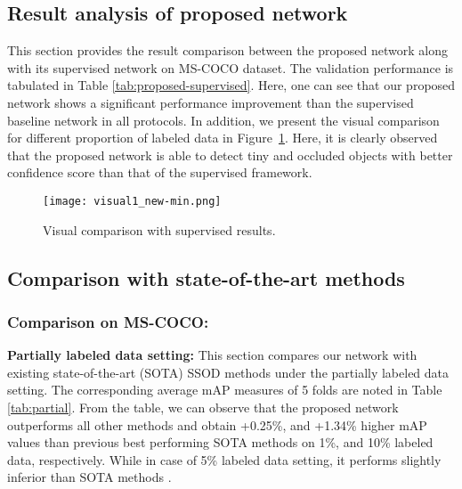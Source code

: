 \documentclass[10pt,twocolumn,letterpaper]{article}
\begin{document}
\subsection{Result analysis of proposed network}
This section provides the result comparison between the proposed network along with its supervised network on MS-COCO dataset. 
The validation performance is tabulated in Table \ref{tab:proposed-supervised}. Here, one can see that our proposed network shows a significant performance improvement than the supervised baseline network in all protocols. In addition, we present the visual comparison for different proportion of labeled data in Figure~\ref{fig:visual1}. Here, it is clearly observed that the proposed network is able to detect tiny and occluded objects with better confidence score than that of the supervised framework.
\vspace{-0.5em}
\begin{figure}[t!]
    \centering
        \texttt{[image: visual1\_new-min.png]}
    \caption{Visual comparison with supervised results.}
    \label{fig:visual1} \vspace{-1em}
\end{figure}








\subsection{Comparison with state-of-the-art methods}
\subsubsection{Comparison on MS-COCO:}
\textbf{Partially labeled data setting:}
This section compares our network with existing state-of-the-art (SOTA) SSOD methods under the partially labeled data setting. The corresponding average mAP measures of 5 folds are noted in Table \ref{tab:partial}. 
From the table, we can observe that the proposed network outperforms all other methods and obtain +0.25\%, and +1.34\% higher mAP values than previous best performing SOTA methods \cite{zhang2021semi, PseCo} on 1\%, and 10\% labeled data, respectively. While in case of 5\% labeled data setting, it performs slightly inferior than SOTA methods \cite{LabelMatch, PseCo}.
\end{document}
